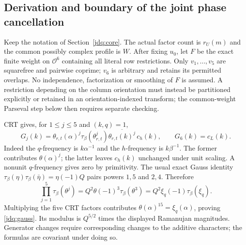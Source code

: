 \subsection{Derivation and boundary of the joint phase cancellation}
\label{jdq:details}
Keep the notation of Section~\ref{jdq:core}. The actual factor count is
$r_U(m)$ and the common possibly complex profile is $W$. After fixing
$u_0$, let $F$ be the exact finite weight on $\mathcal O^6$ containing
all literal row restrictions. Only $v_1,\ldots,v_5$ are squarefree and
pairwise coprime; $v_6$ is arbitrary and retains its permitted overlaps.
No independence, factorization or smoothing of $F$ is assumed. A
restriction depending on the column orientation must instead be
partitioned explicitly or retained in an orientation-indexed transform;
the common-weight Parseval step below then requires separate checking.

CRT gives, for $1\le j\le5$ and $(k,q)=1$,
\[
 G_j(k)=\theta_{r,t}(\alpha)^j
       \tau_\beta(\theta_{r,t}^j)
       \overline{\theta_{r,t}(k)^j}\,c_h(k),
 \qquad G_6(k)=c_L(k).
\]
Indeed the $q$-frequency is $k\alpha^{-1}$ and the $h$-frequency is
$k\beta^{-1}$. The former contributes $\theta(\alpha)^j$;
the latter leaves $c_h(k)$ unchanged under unit scaling. A nonunit
$q$-frequency gives zero by primitivity. The usual exact Gauss identity
$\tau_\beta(\eta)\tau_\beta(\bar\eta)=\eta(-1)Q$ pairs powers
$1,5$ and $2,4$. Therefore
\[
 \prod_{j=1}^5\tau_\beta(\theta^j)
 =Q^2\theta(-1)^3\tau_\beta(\theta^3)
 =Q^2\xi_q(-1)\tau_\beta(\xi_q).
\]
Multiplying the five CRT factors contributes
$\theta(\alpha)^{15}=\xi_q(\alpha)$, proving
\eqref{jdq:gauss}. Its modulus is $Q^{5/2}$ times the displayed
Ramanujan magnitudes. Generator changes require corresponding changes
to the additive characters; the formulas are covariant under doing so.

